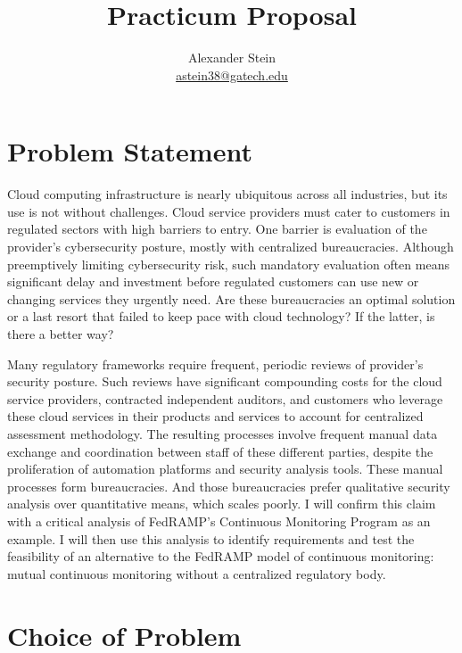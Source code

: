 \documentclass{jdf}
\begin{document}
\title{Practicum Proposal}
\author{Alexander Stein \\ \href{mailto:astein38@gatech.edu}{astein38@gatech.edu}}

\maketitle
\thispagestyle{fancy}

\section{Problem Statement}

Cloud computing infrastructure is nearly ubiquitous across all industries, but its use is not without challenges. Cloud service providers must cater to customers in regulated sectors with high barriers to entry. One barrier is evaluation of the provider's cybersecurity posture, mostly with centralized bureaucracies. Although preemptively limiting cybersecurity risk, such mandatory evaluation often means significant delay and investment before regulated customers can use new or changing services they urgently need. Are these bureaucracies an optimal solution or a last resort that failed to keep pace with cloud technology? If the latter, is there a better way?

Many regulatory frameworks require frequent, periodic reviews of provider's security posture. Such reviews have significant compounding costs for the cloud service providers, contracted independent auditors, and customers who leverage these cloud services in their products and services to account for centralized assessment methodology. The resulting processes involve frequent manual data exchange and coordination between staff of these different parties, despite the proliferation of automation platforms and security analysis tools. These manual processes form bureaucracies. And those bureaucracies prefer qualitative security analysis over quantitative means, which scales poorly. I will confirm this claim with a critical analysis of FedRAMP's Continuous Monitoring Program \citeyear[p.~14]{fedramp_auth_playbook25} as an example. I will then use this analysis to identify requirements and test the feasibility of an alternative to the FedRAMP model of continuous monitoring: mutual continuous monitoring without a centralized regulatory body.

\section{Choice of Problem}
\end{document}

